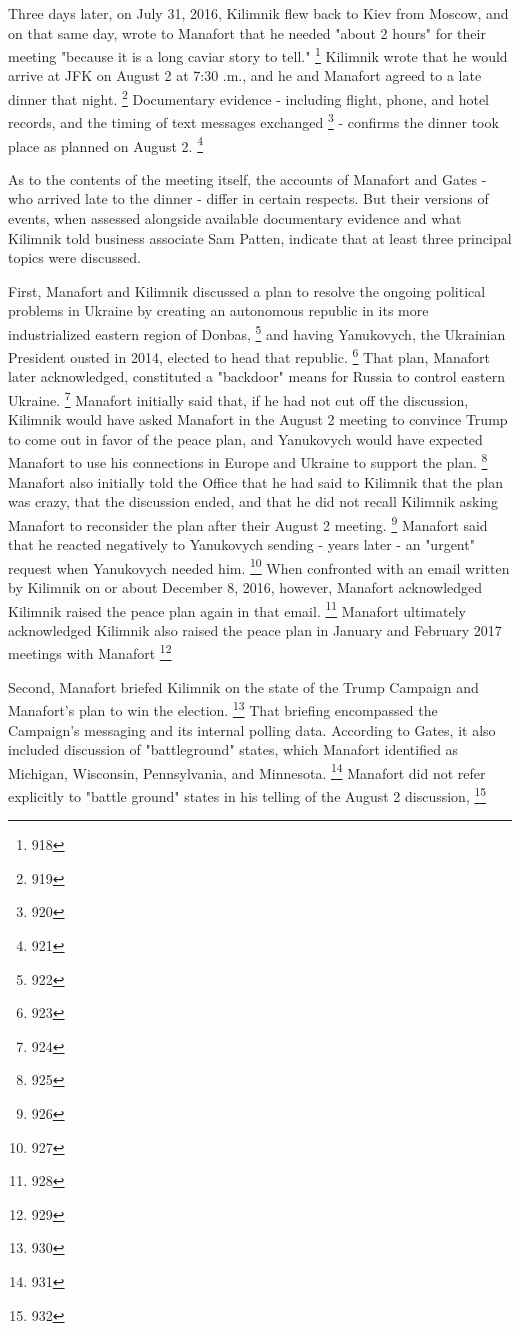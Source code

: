Three days later, on July 31, 2016, Kilimnik flew back to Kiev from Moscow, and on that same day, wrote to Manafort that he needed "about 2 hours" for their meeting "because it is a long caviar story to tell."%
\footnote{918}
Kilimnik wrote that he would arrive at JFK on August 2 at 7:30 .m., and he and Manafort agreed to a late dinner that night.%
\footnote{919}
Documentary evidence - including flight, phone, and hotel records, and the timing of text messages exchanged%
\footnote{920}
- confirms the dinner took place as planned on August 2.%
\footnote{921}

As to the contents of the meeting itself, the accounts of Manafort and Gates - who arrived late to the dinner - differ in certain respects.
But their versions of events, when assessed alongside available documentary evidence and what Kilimnik told business associate Sam Patten, indicate that at least three principal topics were discussed.

First, Manafort and Kilimnik discussed a plan to resolve the ongoing political problems in Ukraine by creating an autonomous republic in its more industrialized eastern region of Donbas,%
\footnote{922}
and having Yanukovych, the Ukrainian President ousted in 2014, elected to head that republic.%
\footnote{923}
That plan, Manafort later acknowledged, constituted a "backdoor" means for Russia to control eastern Ukraine.%
\footnote{924}
Manafort initially said that, if he had not cut off the discussion, Kilimnik would have asked Manafort in the August 2 meeting to convince Trump to come out in favor of the peace plan, and Yanukovych would have expected Manafort to use his connections in Europe and Ukraine to support the plan.%
\footnote{925}
Manafort also initially told the Office that he had said to Kilimnik that the plan was crazy, that the discussion ended, and that he did not recall Kilimnik asking Manafort to reconsider the plan after their August 2 meeting.%
\footnote{926}
Manafort said
that he reacted negatively to Yanukovych sending - years later - an "urgent" request when Yanukovych needed him.%
\footnote{927}
When confronted with an email written by Kilimnik on or about December 8, 2016, however, Manafort acknowledged Kilimnik raised the peace plan again in that email.%
\footnote{928}
Manafort ultimately acknowledged Kilimnik also raised the peace plan in January and February 2017 meetings with Manafort
\footnote{929}

Second, Manafort briefed Kilimnik on the state of the Trump Campaign and Manafort's plan to win the election.%
\footnote{930}
That briefing encompassed the Campaign's messaging and its internal polling data.
According to Gates, it also included discussion of "battleground" states, which Manafort identified as Michigan, Wisconsin, Pennsylvania, and Minnesota.%
\footnote{931}
Manafort did not refer explicitly to "battle ground" states in his telling of the August 2 discussion,
\footnote{932}

